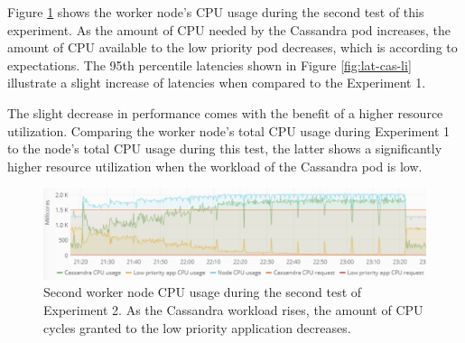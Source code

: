 %
Figure \ref{fig:cpu-cas-lpp-li-2} shows the worker node's CPU usage during the second test of this experiment. As the amount of CPU needed by the Cassandra pod increases, the amount of CPU available to the low priority pod decreases, which is according to expectations. The 95th percentile latencies shown in Figure \ref{fig:lat-cas-li} illustrate a slight increase of latencies when compared to the Experiment 1.


The slight decrease in performance comes with the benefit of a higher resource utilization. Comparing the worker node's total CPU usage during Experiment 1 to the node's total CPU usage during this test, the latter shows a significantly higher resource utilization when the workload of the Cassandra pod is low.

\begin{figure}
\centering
\includegraphics[width=\columnwidth]{Images/Experiments/CPU/Grafana/cpu-cas-lpp-li-2.PNG}
\caption{Second worker node CPU usage during the second test of Experiment 2. As the Cassandra workload rises, the amount of CPU cycles granted to the low priority application decreases.}
\label{fig:cpu-cas-lpp-li-2}
\end{figure}

